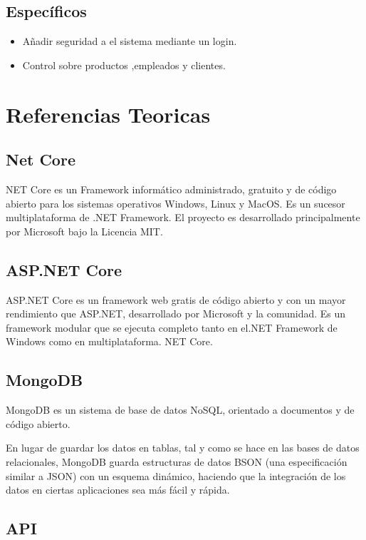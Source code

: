 \documentclass[12pt,letterpaper]{article}
\begin{document}
    \subsection{Específicos}
    \begin{itemize}
        \item Añadir seguridad a el sistema mediante un login.
        \item Control sobre productos ,empleados y clientes.
    \end{itemize}

\section{Referencias Teoricas}

\subsection{Net Core}

NET Core es un Framework informático administrado, gratuito y de código abierto para los sistemas operativos Windows, Linux y MacOS. Es un sucesor multiplataforma de .NET Framework. El proyecto es desarrollado principalmente por Microsoft bajo la Licencia MIT.

\subsection{ASP.NET Core}

ASP.NET Core es un framework web gratis de código abierto y con un mayor rendimiento que ASP.NET, desarrollado por Microsoft y la comunidad. Es un framework modular que se ejecuta completo tanto en el.NET Framework de Windows como en multiplataforma. NET Core.

\subsection{MongoDB}

MongoDB es un sistema de base de datos NoSQL, orientado a documentos y de código abierto.

En lugar de guardar los datos en tablas, tal y como se hace en las bases de datos relacionales, MongoDB guarda estructuras de datos BSON (una especificación similar a JSON) con un esquema dinámico, haciendo que la integración de los datos en ciertas aplicaciones sea más fácil y rápida. 

\subsection{API}
\end{document}
